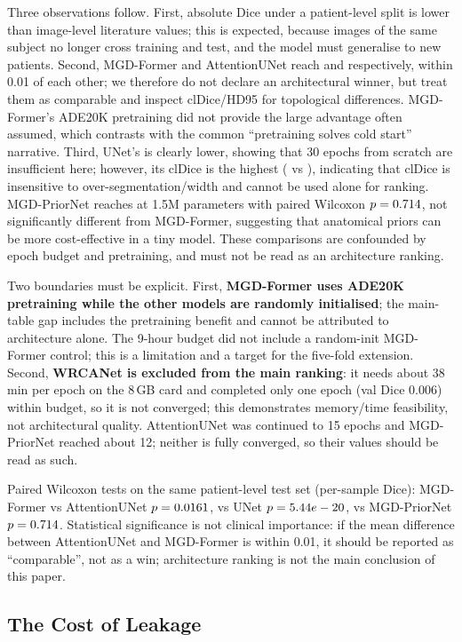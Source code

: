 Three observations follow. First, absolute Dice under a patient-level split is lower than image-level literature values; this is expected, because images of the same subject no longer cross training and test, and the model must generalise to new patients. Second, MGD-Former and AttentionUNet reach \gDiceMF{} and \gDiceAtt{} respectively, within 0.01 of each other; we therefore do not declare an architectural winner, but treat them as comparable and inspect clDice/HD95 for topological differences. MGD-Former's ADE20K pretraining did not provide the large advantage often assumed, which contrasts with the common ``pretraining solves cold start'' narrative. Third, UNet's \gDiceUNet{} is clearly lower, showing that 30 epochs from scratch are insufficient here; however, its clDice is the highest (\gClDiceUNet{} vs \gClDiceMF{}), indicating that clDice is insensitive to over-segmentation/width and cannot be used alone for ranking. MGD-PriorNet reaches \gDicePrior{} at 1.5M parameters with paired Wilcoxon $p=0.714$, not significantly different from MGD-Former, suggesting that anatomical priors can be more cost-effective in a tiny model. These comparisons are confounded by epoch budget and pretraining, and must not be read as an architecture ranking.

Two boundaries must be explicit. First, \textbf{MGD-Former uses ADE20K pretraining while the other models are randomly initialised}; the main-table gap includes the pretraining benefit and cannot be attributed to architecture alone. The 9-hour budget did not include a random-init MGD-Former control; this is a limitation and a target for the five-fold extension. Second, \textbf{WRCANet is excluded from the main ranking}: it needs about 38\,min per epoch on the 8\,GB card and completed only one epoch (val Dice 0.006) within budget, so it is not converged; this demonstrates memory/time feasibility, not architectural quality. AttentionUNet was continued to 15 epochs and MGD-PriorNet reached about 12; neither is fully converged, so their values should be read as such.

Paired Wilcoxon tests on the same patient-level test set (per-sample Dice): MGD-Former vs AttentionUNet $p=0.0161$, vs UNet $p=5.44e-20$, vs MGD-PriorNet $p=0.714$. Statistical significance is not clinical importance: if the mean difference between AttentionUNet and MGD-Former is within 0.01, it should be reported as ``comparable'', not as a win; architecture ranking is not the main conclusion of this paper.

\subsection{The Cost of Leakage}


